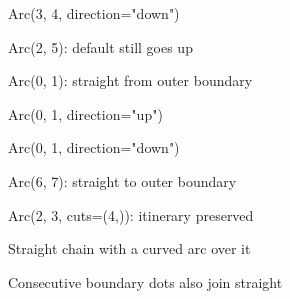 \documentclass{article}
\begin{document}
\clearpage
\begin{center}
\Large Arc(3, 4, direction="down")\par\bigskip
{}
\end{center}
\clearpage
\begin{center}
\Large Arc(2, 5): default still goes up\par\bigskip
{}
\end{center}
\clearpage
\begin{center}
\Large Arc(0, 1): straight from outer boundary\par\bigskip
{}
\end{center}
\clearpage
\begin{center}
\Large Arc(0, 1, direction="up")\par\bigskip
{}
\end{center}
\clearpage
\begin{center}
\Large Arc(0, 1, direction="down")\par\bigskip
{}
\end{center}
\clearpage
\begin{center}
\Large Arc(6, 7): straight to outer boundary\par\bigskip
{}
\end{center}
\clearpage
\begin{center}
\Large Arc(2, 3, cuts=(4,)): itinerary preserved\par\bigskip
{}
\end{center}
\clearpage
\begin{center}
\Large Straight chain with a curved arc over it\par\bigskip
{}
\end{center}
\clearpage
\begin{center}
\Large Consecutive boundary dots also join straight\par\bigskip
{}
\end{center}
\end{document}
